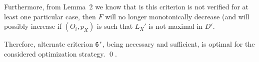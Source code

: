 Furthermore, from Lemma~2 we know that is this criterion is not
verified for at least one particular case, then $F$ will no longer
monotonically decrease (and will possibly increase if $(O_i,p_X)$ is
such that $L_X'$ is not maximal in $D'$.

Therefore, alternate criterion \texttt{6'}, being necessary and
sufficient, is optimal for the considered optimization strategy.
\hfill\qed.\\
